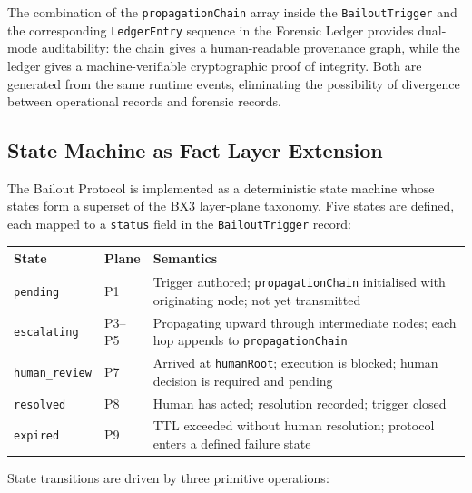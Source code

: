 The combination of the \texttt{propagationChain} array inside the \texttt{BailoutTrigger}
and the corresponding \texttt{LedgerEntry} sequence in the Forensic Ledger provides
dual-mode auditability: the chain gives a human-readable provenance graph, while the
ledger gives a machine-verifiable cryptographic proof of integrity.  Both are generated
from the same runtime events, eliminating the possibility of divergence between
operational records and forensic records.

\subsection{State Machine as Fact Layer Extension}

The Bailout Protocol is implemented as a deterministic state machine whose states
form a superset of the BX3 layer-plane taxonomy.  Five states are defined, each
mapped to a \texttt{status} field in the \texttt{BailoutTrigger} record:

\bigskip
\noindent
\begin{tabular}{llp{7.5cm}}
  \hline
  \textbf{State} & \textbf{Plane} & \textbf{Semantics} \\
  \hline
  \texttt{pending}         & P1 & Trigger authored; \texttt{propagationChain} initialised with
                              originating node; not yet transmitted \\
  \texttt{escalating}    & P3–P5 & Propagating upward through intermediate nodes;
                              each hop appends to \texttt{propagationChain} \\
  \texttt{human\_review} & P7 & Arrived at \texttt{humanRoot}; execution is blocked;
                              human decision is required and pending \\
  \texttt{resolved}      & P8 & Human has acted; resolution recorded; trigger closed \\
  \texttt{expired}       & P9 & TTL exceeded without human resolution; protocol
                              enters a defined failure state \\
  \hline
\end{tabular}
\bigskip

State transitions are driven by three primitive operations:

